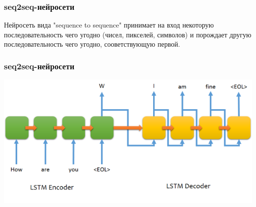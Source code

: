 \documentclass[10pt, compress]{beamer}
\begin{document}
\begin{frame}
  \frametitle{seq2seq-нейросети}
  Нейросеть вида "sequence to sequence" принимает на вход некоторую последовательность чего угодно (чисел, пикселей, символов) и порождает другую последовательность чего угодно, сооветствующую первой.
\end{frame}

\begin{frame}
  \frametitle{seq2seq-нейросети}
  \includegraphics[width=\textwidth]{images/lstm.png}
\end{frame}

\end{document}

